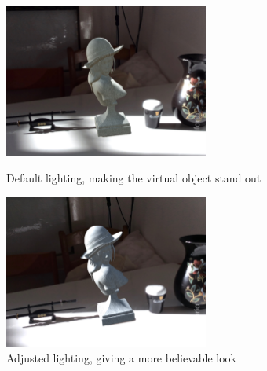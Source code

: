 \begin{figure}[H]
\centering
\includegraphics[width=0.6\textwidth]{Figures/fake.jpg}
\caption{Default lighting, making the virtual object stand out}
\includegraphics[width=0.6\textwidth]{Figures/realish.jpg}
\caption{Adjusted lighting, giving a more believable look}
\end{figure}
